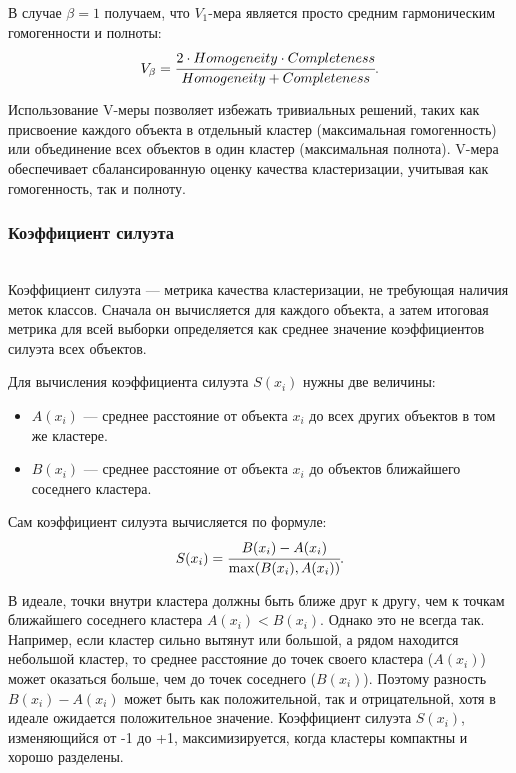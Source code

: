 В случае $\beta = 1$ получаем, что $V_1$-мера является просто средним гармоническим гомогенности и полноты:
\begin{equation*}
    V_\beta = \cfrac{2 \cdot Homogeneity \cdot Completeness}{Homogeneity + Completeness}.
\end{equation*}

Использование V-меры позволяет избежать тривиальных решений, таких как присвоение каждого объекта в отдельный кластер (максимальная гомогенность) или объединение всех объектов в один кластер (максимальная полнота).  V-мера обеспечивает сбалансированную оценку качества кластеризации, учитывая как гомогенность, так и полноту.

\subsubsection{Коэффициент силуэта} \hfill\\

Коэффициент силуэта — метрика качества кластеризации, не требующая наличия меток классов. Сначала он вычисляется для каждого объекта, а затем итоговая метрика для всей выборки определяется как среднее значение коэффициентов силуэта всех объектов.

Для вычисления коэффициента силуэта $S(x_i)$ нужны две величины:

\begin{itemize}
    \item $A(x_i)$ — среднее расстояние от объекта $x_i$ до всех других объектов в том же кластере.
    \item $B(x_i)$ — среднее расстояние от объекта $x_i$ до объектов ближайшего соседнего кластера.
\end{itemize}

Сам коэффициент силуэта вычисляется по формуле:
\begin{equation*}
    S(x_i) = \cfrac{B(x_i)-A(x_i)}{\max (B(x_i), A(x_i))}.
\end{equation*}

В идеале, точки внутри кластера должны быть ближе друг к другу, чем к точкам ближайшего соседнего кластера $A(x_i) < B(x_i)$. Однако это не всегда так.  Например, если кластер сильно вытянут или большой, а рядом находится небольшой кластер, то среднее расстояние до точек своего кластера ($A(x_i)$) может оказаться больше, чем до точек соседнего ($B(x_i)$).  Поэтому разность $B(x_i) - A(x_i)$ может быть как положительной, так и отрицательной, хотя в идеале ожидается положительное значение.  Коэффициент силуэта $S(x_i)$, изменяющийся от -1 до +1, максимизируется, когда кластеры компактны и хорошо разделены.

